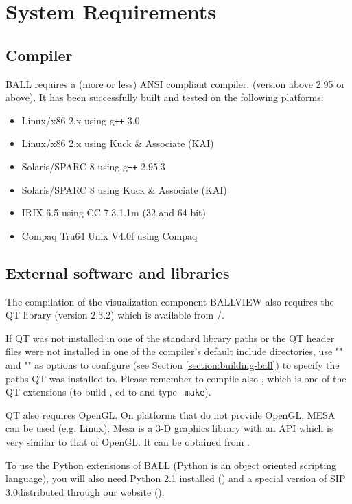 \section{System Requirements}

\subsection{Compiler}
  BALL requires a (more or less) ANSI compliant \CPP compiler.
  (version above 2.95 or above).
  It has been successfully built and tested on the following platforms:
	\begin{itemize}	
   	\item Linux/x86 2.x using g{\tt ++} 3.0
   	\item Linux/x86 2.x using Kuck \& Associate (KAI) 
   	\item Solaris/SPARC 8 using g{\tt ++} 2.95.3
   	\item Solaris/SPARC 8 using Kuck \& Associate (KAI) 
   	\item IRIX 6.5 using CC 7.3.1.1m (32 and 64 bit)
   	\item Compaq Tru64 Unix V4.0f using Compaq 
 	\end{itemize}

\subsection{External software and libraries}
The compilation of the visualization component BALLVIEW also requires
the QT library (version 2.3.2) which is available from
/.

If QT was not installed in one of the standard library paths or the
QT header files were not installed in one of the compiler's default
include directories, use "" and
"" as
options to configure (see Section \ref{section:building-ball}) to specify the paths
QT was installed to.
Please remember to compile also , which is one of the QT extensions
(to build , cd to {\tt{}} and type {\tt
make}).

QT also requires OpenGL. On platforms that do not provide OpenGL, MESA can
be used (e.g. Linux). Mesa is a 3-D graphics library with an API which is 
very similar to that of OpenGL. It can be obtained from .

To use the Python extensions of BALL (Python is an object oriented scripting
language), you will also need Python 2.1 installed
() and a special version of SIP 3.0distributed through 
our website (). 

